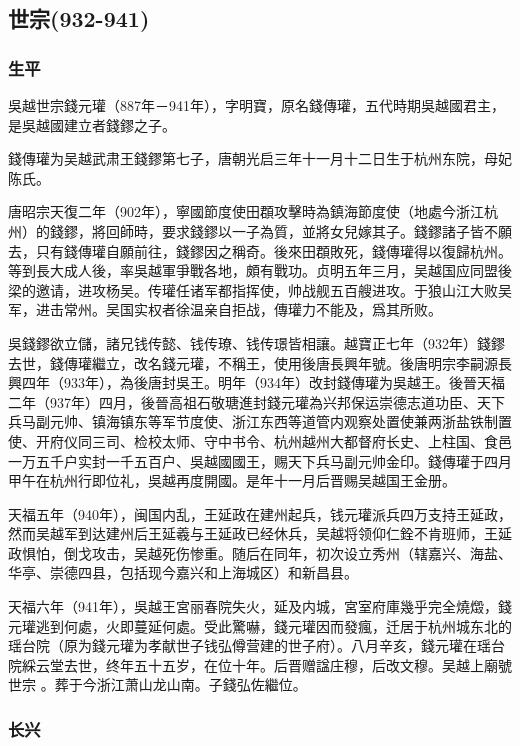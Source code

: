 
\subsection{世宗\tiny(932-941)}

\subsubsection{生平}

吳越世宗錢元瓘（887年－941年），字明寶，原名錢傳瓘，五代時期吳越國君主，是吳越國建立者錢鏐之子。

錢傳瓘为吴越武肃王錢鏐第七子，唐朝光启三年十一月十二日生于杭州东院，母妃陈氏。

唐昭宗天復二年（902年），寧國節度使田頵攻擊時為鎮海節度使（地處今浙江杭州）的錢鏐，將回師時，要求錢鏐以一子為質，並將女兒嫁其子。錢鏐諸子皆不願去，只有錢傳瓘自願前往，錢鏐因之稱奇。後來田頵敗死，錢傳瓘得以復歸杭州。等到長大成人後，率吳越軍爭戰各地，頗有戰功。贞明五年三月，吴越国应同盟後梁的邀请，进攻杨吴。传瓘任诸军都指挥使，帅战舰五百艘进攻。于狼山江大败吴军，进击常州。吴国实权者徐温亲自拒战，傳瓘力不能及，爲其所败。

吳錢鏐欲立儲，諸兄钱传懿、钱传璙、钱传璟皆相讓。越寶正七年（932年）錢鏐去世，錢傳瓘繼立，改名錢元瓘，不稱王，使用後唐長興年號。後唐明宗李嗣源長興四年（933年），為後唐封吳王。明年（934年）改封錢傳瓘为吳越王。後晉天福二年（937年）四月，後晉高祖石敬瑭進封錢元瓘為兴邦保运崇德志道功臣、天下兵马副元帅、镇海镇东等军节度使、浙江东西等道管内观察处置使兼两浙盐铁制置使、开府仪同三司、检校太师、守中书令、杭州越州大都督府长史、上柱国、食邑一万五千户实封一千五百户、吳越國國王，赐天下兵马副元帅金印。錢傳瓘于四月甲午在杭州行即位礼，吳越再度開國。是年十一月后晋赐吴越国王金册。

天福五年（940年），闽国内乱，王延政在建州起兵，钱元瓘派兵四万支持王延政，然而吴越军到达建州后王延羲与王延政已经休兵，吴越将领仰仁銓不肯班师，王延政惧怕，倒戈攻击，吴越死伤惨重。随后在同年，初次设立秀州（辖嘉兴、海盐、华亭、崇德四县，包括现今嘉兴和上海城区）和新昌县。

天福六年（941年），吳越王宮丽春院失火，延及内城，宮室府庫幾乎完全燒燬，錢元瓘逃到何處，火即蔓延何處。受此驚嚇，錢元瓘因而發瘋，迁居于杭州城东北的瑶台院（原为錢元瓘为孝献世子钱弘僔营建的世子府）。八月辛亥，錢元瓘在瑶台院綵云堂去世，终年五十五岁，在位十年。后晋赠諡庄穆，后改文穆。吴越上廟號世宗 。葬于今浙江萧山龙山南。子錢弘佐繼位。

\subsubsection{长兴}

